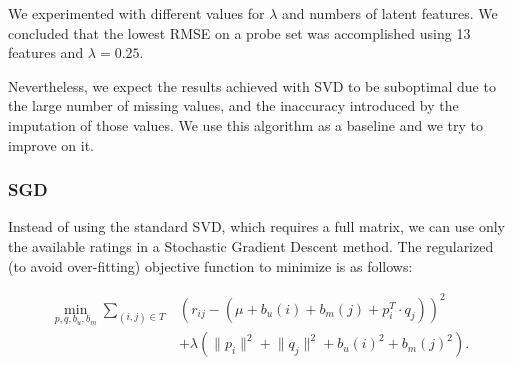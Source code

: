\documentclass[10pt,conference,compsocconf]{IEEEtran}
\begin{document}
	
	
	We experimented with different values for $\lambda$ and numbers of latent features. We concluded that the lowest RMSE on a probe set was accomplished using 13 features and $\lambda = 0.25$.
	
	Nevertheless, we expect the results achieved with SVD to be suboptimal due to the large number of missing values, and the inaccuracy introduced by the imputation of those values. We use this algorithm as a baseline and we try to improve on it.
	
	\subsubsection*{\textbf{SGD}} Instead of using the standard SVD, which requires a full matrix, we can use only the available ratings in a Stochastic Gradient Descent method. The regularized (to avoid over-fitting) objective function to minimize is as follows:
	
	\begin{equation}
	\begin{split}
	\min_{p,q,b_u,b_m} \sum_{(i,j) \in T} &(r_{ij} - (\mu + b_u(i) + b_m(j) + p_i^T \cdot q_j))^2 \\ &+ \lambda(\lVert p_i \rVert^2 + \lVert q_j \rVert^2 + b_u(i)^2 + b_m(j)^2).
	\end{split}
	\end{equation}
	
\end{document}
